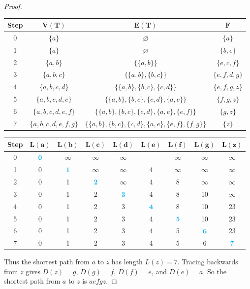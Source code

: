 \documentclass[14pt]{extarticle}
\newcommand{\es}{\varnothing}
\newcommand{\cy}{\color{cyan}}
\begin{document}
\begin{proof}
\begin{center}
\begin{tabular}{|c|c|c|c|}
\hline
{\bf \cy Step} & {\cy \(\bm{V(T)}\)} & {\cy \(\bm{E(T)}\)} & {\cy \(\bm{F}\)}  \\
\hline
0 & \(\{a\}\) & \(\es\) & \(\{a\}\) \\
1 & \(\{a\}\) & \(\es\) & \(\{b,e\}\) \\
2 & \(\{a,b\}\) & \(\{\{a,b\}\}\) & \(\{e,c,f\}\) \\
3 & \(\{a,b,c\}\) & \(\{\{a,b\}, \{b,c\}\}\) & \(\{e,f,d,g\}\) \\
4 & \(\{a,b,c,d\}\) & \(\{\{a,b\}, \{b,c\}, \{c,d\}\}\) & \(\{e,f,g,z\}\) \\
5 & \(\{a,b,c,d,e\}\) & \(\{\{a,b\}, \{b,c\}, \{c,d\}, \{a,e\}\}\) & \(\{f,g,z\}\) \\
6 & \(\{a,b,c,d,e,f\}\) & \(\{\{a,b\}, \{b,c\}, \{c,d\}, \{a,e\}, \{e,f\}\}\) & \(\{g,z\}\) \\
7 & \(\{a,b,c,d,e,f,g\}\) & \(\{\{a,b\}, \{b,c\}, \{c,d\}, \{a,e\}, \{e,f\}, \{f,g\}\}\) & \(\{z\}\) \\
\hline
\end{tabular}

\begin{tabular}{|c|c|c|c|c|c|c|c|c|}
\hline
{\bf \cy Step} & {\cy \(\bm{L(a)}\)} & {\cy\(\bm{L(b)}\)} & {\cy\(\bm{L(c)}\)} & {\cy\(\bm{L(d)}\)} & {\cy\(\bm{L(e)}\)} & {\cy\(\bm{L(f)}\)} & {\cy\(\bm{L(g)}\)} & {\cy\(\bm{L(z)}\)}\\
\hline
0 & \({\cy \bm{0}}\) & \(\infty\) & \(\infty\) & \(\infty\) & & \(\infty\) & \(\infty\) & \(\infty\) \\
1 & 0 & \({\cy \bm{1}}\) & \(\infty\) & \(\infty\) & 4 & \(\infty\) & \(\infty\) & \(\infty\) \\
2 & 0 & 1 & \({\cy \bm{2}}\) & \(\infty\) & 4 & 8 & \(\infty\) & \(\infty\) \\
3 & 0 & 1 & 2 & \({\cy \bm{3}}\) & 4 & 8 & 10 & \(\infty\) \\
4 & 0 & 1 & 2 & 3 & \({\cy \bm{4}}\) & 8 & 10 & 23 \\
5 & 0 & 1 & 2 & 3 & 4 & \({\cy \bm{5}}\) & 10 & 23 \\
6 & 0 & 1 & 2 & 3 & 4 & 5 & \({\cy \bm{6}}\) & 23 \\
7 & 0 & 1 & 2 & 3 & 4 & 5 & 6 & \({\cy \bm{7}}\) \\
\hline
\end{tabular}
\end{center}

Thus the shortest path from \(a\) to \(z\) has length \(L(z) = 7\). Tracing backwards from \(z\) gives \(D(z) = g\), 
\(D(g) = f\), \(D(f) = e\), and \(D(e) = a\). So the shortest path from \(a\) to \(z\) is \(aefgz\).
\end{proof}
\end{document}
